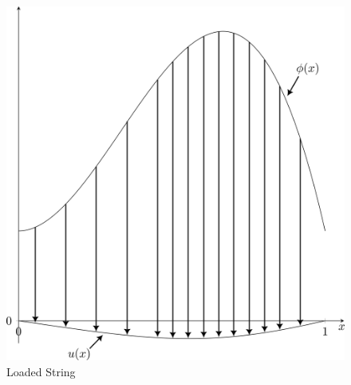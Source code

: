 \begin{figure}\label{fig:LoadedString}
    \centering
    \includegraphics[width=0.5\linewidth]{include/loadedstring.png}
    \caption{Loaded String}
\end{figure}